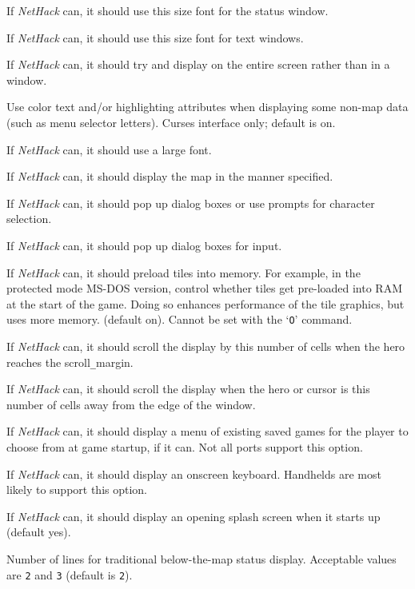 \item[\ib{font\verb+_+size\verb+_+status}]
If {\it NetHack\/} can, it should use this size font for the status window.
\item[\ib{font\verb+_+size\verb+_+text}]
If {\it NetHack\/} can, it should use this size font for text windows.
\item[\ib{fullscreen}]
If {\it NetHack\/} can, it should try and display on the entire screen rather than in a window.
\item[\ib{guicolor}]
Use color text and/or highlighting attributes when displaying some
non-map data (such as menu selector letters).
Curses interface only; default is on.
\item[\ib{large\verb+_+font}]
If {\it NetHack\/} can, it should use a large font.
\item[\ib{map\verb+_+mode}]
If {\it NetHack\/} can, it should display the map in the manner specified.
\item[\ib{player\verb+_+selection}]
If {\it NetHack\/} can, it should pop up dialog boxes or use prompts for character selection.
\item[\ib{popup\verb+_+dialog}]
If {\it NetHack\/} can, it should pop up dialog boxes for input.
\item[\ib{preload\verb+_+tiles}]
If {\it NetHack\/} can, it should preload tiles into memory.
For example, in the protected mode MS-DOS version, control whether tiles
get pre-loaded into RAM at the start of the game.  Doing so
enhances performance of the tile graphics, but uses more memory. (default on).
Cannot be set with the `{\tt O}' command.
\item[\ib{scroll\verb+_+amount}]
If {\it NetHack\/} can, it should scroll the display by this number of cells
when the hero reaches the scroll\verb+_+margin.
\item[\ib{scroll\verb+_+margin}]
If {\it NetHack\/} can, it should scroll the display when the hero or cursor
is this number of cells away from the edge of the window.
\item[\ib{selectsaved}]
If {\it NetHack\/} can, it should display a menu of existing saved games for the player to
choose from at game startup, if it can. Not all ports support this option.
\item[\ib{softkeyboard}]
If {\it NetHack\/} can, it should display an onscreen keyboard.
Handhelds are most likely to support this option.
\item[\ib{splash\verb+_+screen}]
If {\it NetHack\/} can, it should display an opening splash screen when
it starts up (default yes).
\item[\ib{statuslines}]
Number of lines for traditional below-the-map status display.
Acceptable values are {\tt 2} and {\tt 3} (default is {\tt 2}).

